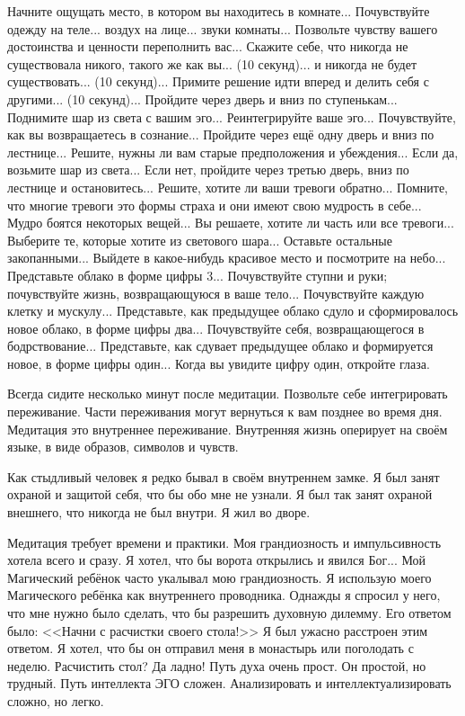 \documentclass[10pt, fleqn]{article}
\begin{document}
Начните ощущать место, в котором вы находитесь в комнате... Почувствуйте одежду на теле... воздух на лице... звуки комнаты... Позвольте чувству вашего достоинства и ценности переполнить вас... Скажите себе, что никогда не существовала никого, такого же как вы... (10 секунд)... и никогда не будет существовать... (10 секунд)... Примите решение идти вперед и делить себя с другими... (10 секунд)... Пройдите через дверь и вниз по ступенькам... Поднимите шар из света с вашим эго... Реинтегрируйте ваше эго... Почувствуйте, как вы возвращаетесь в сознание... Пройдите через ещё одну дверь и вниз по лестнице... Решите, нужны ли вам старые предположения и убеждения... Если да, возьмите шар из света... Если нет, пройдите через третью дверь, вниз по лестнице и остановитесь... Решите, хотите ли ваши тревоги обратно... Помните, что многие тревоги это формы страха и они имеют свою мудрость в себе... Мудро боятся некоторых вещей... Вы решаете, хотите ли часть или все тревоги... Выберите те, которые хотите из светового шара... Оставьте остальные закопанными... Выйдете в какое-нибудь красивое место и посмотрите на небо... Представьте облако в форме цифры 3... Почувствуйте ступни и руки; почувствуйте жизнь, возвращающуюся в ваше тело... Почувствуйте каждую клетку и мускулу... Представьте, как предыдущее облако сдуло и сформировалось новое облако, в форме цифры два... Почувствуйте себя, возвращающегося в бодрствование... Представьте, как сдувает предыдущее облако и формируется новое, в форме цифры один... Когда вы увидите цифру один, откройте глаза.

Всегда сидите несколько минут после медитации. Позвольте себе интегрировать переживание. Части переживания могут вернуться к вам позднее во время дня. Медитация это внутреннее переживание. Внутренняя жизнь оперирует на своём языке, в виде образов, символов и чувств.

Как стыдливый человек я редко бывал в своём внутреннем замке. Я был занят охраной и защитой себя, что бы обо мне не узнали. Я был так занят охраной внешнего, что никогда не был внутри. Я жил во дворе.

Медитация требует времени и практики. Моя грандиозность и импульсивность хотела всего и сразу. Я хотел, что бы ворота открылись и явился Бог... Мой Магический ребёнок часто укалывал мою грандиозность. Я использую моего Магического ребёнка как внутреннего проводника. Однажды я спросил у него, что мне нужно было сделать, что бы разрешить духовную дилемму. Его ответом было: <<Начни с расчистки своего стола!>> Я был ужасно расстроен этим ответом. Я хотел, что бы он отправил меня в монастырь или поголодать с неделю. Расчистить стол? Да ладно! Путь духа очень прост. Он простой, но трудный. Путь интеллекта ЭГО сложен. Анализировать и интеллектуализировать сложно, но легко.
\end{document}

